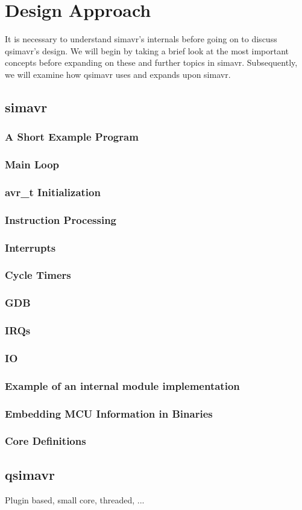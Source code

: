 
\chapter{Design Approach} \label{chapter:designapproach}

It is necessary to understand simavr's internals before going on to discuss
qsimavr's design. We will begin by taking a brief look at the most important
concepts before expanding on these and further topics in simavr. Subsequently,
we will examine how qsimavr uses and expands upon simavr.

\section{simavr}

\subsection{A Short Example Program}
\subsection{Main Loop}
\subsection{avr\_t Initialization}
\subsection{Instruction Processing}
\subsection{Interrupts}
\subsection{Cycle Timers}
\subsection{GDB}
\subsection{IRQs}
\subsection{IO}
\subsection{Example of an internal module implementation} %
\subsection{Embedding MCU Information in Binaries}
\subsection{Core Definitions}

\section{qsimavr}

Plugin based, small core, threaded, ...

